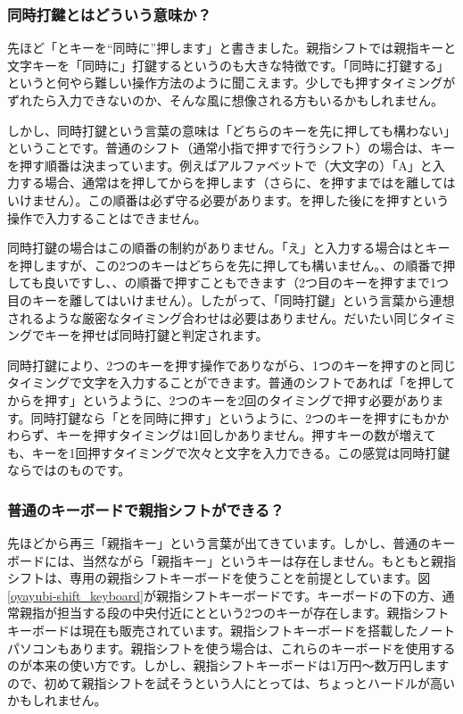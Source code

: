 \subsubsection*{同時打鍵とはどういう意味か？}

先ほど「とキーを“同時に”押します」と書きました。親指シフトでは親指キーと文字キーを「同時に」打鍵するというのも大きな特徴です。「同時に打鍵する」というと何やら難しい操作方法のように聞こえます。少しでも押すタイミングがずれたら入力できないのか、そんな風に想像される方もいるかもしれません。

しかし、同時打鍵という言葉の意味は「どちらのキーを先に押しても構わない」ということです。普通のシフト（通常小指で押すで行うシフト）の場合は、キーを押す順番は決まっています。例えばアルファベットで（大文字の）「A」と入力する場合、通常はを押してからを押します（さらに、を押すまではを離してはいけません）。この順番は必ず守る必要があります。を押した後にを押すという操作で入力することはできません。

同時打鍵の場合はこの順番の制約がありません。「え」と入力する場合はとキーを押しますが、この2つのキーはどちらを先に押しても構いません。、の順番で押しても良いですし、、の順番で押すこともできます（2つ目のキーを押すまで1つ目のキーを離してはいけません）。したがって、「同時打鍵」という言葉から連想されるような厳密なタイミング合わせは必要はありません。だいたい同じタイミングでキーを押せば同時打鍵と判定されます。

同時打鍵により、2つのキーを押す操作でありながら、1つのキーを押すのと同じタイミングで文字を入力することができます。普通のシフトであれば「を押してからを押す」というように、2つのキーを2回のタイミングで押す必要があります。同時打鍵なら「とを同時に押す」というように、2つのキーを押すにもかかわらず、キーを押すタイミングは1回しかありません。押すキーの数が増えても、キーを1回押すタイミングで次々と文字を入力できる。この感覚は同時打鍵ならではのものです。

\subsubsection*{普通のキーボードで親指シフトができる？}

先ほどから再三「親指キー」という言葉が出てきています。しかし、普通のキーボードには、当然ながら「親指キー」というキーは存在しません。もともと親指シフトは、専用の親指シフトキーボードを使うことを前提としています。図\ref{oyayubi-shift_keyboard}が親指シフトキーボードです。キーボードの下の方、通常親指が担当する段の中央付近にとという2つのキーが存在します。親指シフトキーボードは現在も販売されています。親指シフトキーボードを搭載したノートパソコンもあります。親指シフトを使う場合は、これらのキーボードを使用するのが本来の使い方です。しかし、親指シフトキーボードは1万円～数万円しますので、初めて親指シフトを試そうという人にとっては、ちょっとハードルが高いかもしれません。


